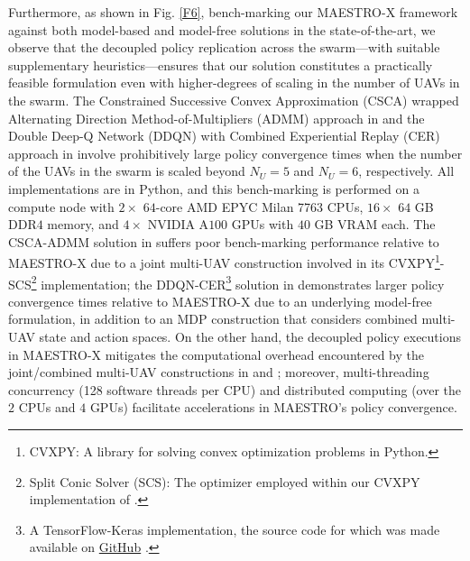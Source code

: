 \documentclass[12pt, draftcls, onecolumn]{IEEEtran}
\theoremstyle{plain}
\theoremstyle{definition}
\theoremstyle{remark}
\begin{document}
Furthermore, as shown in Fig. \ref{F6}, bench-marking our MAESTRO-X framework against both model-based \cite{CSCA-ADMM} and model-free \cite{DDQN} solutions in the state-of-the-art, we observe that the decoupled policy replication across the swarm---with suitable supplementary heuristics---ensures that our solution constitutes a practically feasible formulation even with higher-degrees of scaling in the number of UAVs in the swarm. The Constrained Successive Convex Approximation (CSCA) wrapped Alternating Direction Method-of-Multipliers (ADMM) approach in \cite{CSCA-ADMM} and the Double Deep-Q Network (DDQN) with Combined Experiential Replay (CER) approach in \cite{DDQN} involve prohibitively large policy convergence times when the number of the UAVs in the swarm is scaled beyond $N_{U}{=}5$ and $N_{U}{=}6$, respectively. All implementations are in Python, and this bench-marking is performed on a compute node with $2{\times}$ $64$-core AMD EPYC Milan 7763 CPUs, $16{\times}$ $64$ GB DDR$4$ memory, and $4{\times}$ NVIDIA A$100$ GPUs with $40$ GB VRAM each. The CSCA-ADMM solution in \cite{CSCA-ADMM} suffers poor bench-marking performance relative to MAESTRO-X due to a joint multi-UAV construction involved in its CVXPY\footnote{CVXPY: A library for solving convex optimization problems in Python.}-SCS\footnote{Split Conic Solver (SCS): The optimizer employed within our CVXPY implementation of \cite{CSCA-ADMM}.} implementation; the DDQN-CER\footnote{A TensorFlow-Keras implementation, the source code for which was made available on \href{https://github.com/hbayerlein/uav_data_harvesting.git}{GitHub} \cite{DDQN}.} solution in \cite{DDQN} demonstrates larger policy convergence times relative to MAESTRO-X due to an underlying model-free formulation, in addition to an MDP construction that considers combined multi-UAV state and action spaces. On the other hand, the decoupled policy executions in MAESTRO-X mitigates the computational overhead encountered by the joint/combined multi-UAV constructions in \cite{CSCA-ADMM} and \cite{DDQN}; moreover, multi-threading concurrency (128 software threads per CPU) and distributed computing (over the $2$ CPUs and $4$ GPUs) facilitate accelerations in MAESTRO's policy convergence.
\end{document}
